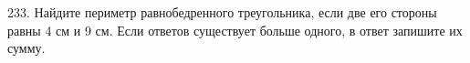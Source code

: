 233. Найдите периметр равнобедренного треугольника, если две его стороны равны 4 см и 9 см. Если ответов существует больше одного, в ответ запишите их сумму.\\

